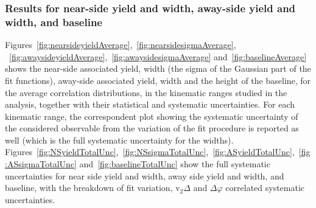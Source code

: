 \subsubsection{Results for near-side yield and width, away-side yield and width, and baseline}

Figures~\ref{fig:nearsideyieldAverage},~\ref{fig:nearsidesigmaAverage}, ~\ref{fig:awaysideyieldAverage},~\ref{fig:awaysidesigmaAverage} and~\ref{fig:baselineAverage} shows the near-side associated yield, width (the sigma of the Gaussian part of the fit functions), away-side associated yield, width and the height of the baseline, for the average correlation distributions, in the kinematic ranges studied in the analysis, together with their statistical and systematic uncertainties. For each kinematic range, the correspondent plot showing the systematic uncertainty of the considered observable from the variation of the fit procedure is reported as well (which is the full systematic uncertainty for the widths).
Figures~\ref{fig:NSyieldTotalUnc},~\ref{fig:NSsigmaTotalUnc},~\ref{fig:ASyieldTotalUnc},~\ref{fig:ASsigmaTotalUnc} and~\ref{fig:baselineTotalUnc} show the full systematic uncertainties for near side yield and width, away side yield and width, and baseline, with the breakdown of fit variation, v$_2\Delta$ and $\Delta\varphi$ correlated systematic uncertainties.

